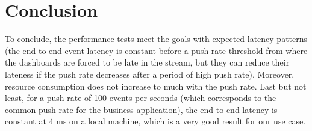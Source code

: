 \section{Conclusion}

To conclude, the performance tests meet the goals with expected latency patterns (the end-to-end event latency is constant before a push rate threshold from where the dashboards are forced to be late in the stream, but they can reduce their lateness if the push rate decreases after a period of high push rate). Moreover, resource consumption does not increase to much with the push rate. Last but not least, for a push rate of 100 events per seconds (which corresponds to the common push rate for the business application), the end-to-end latency is constant at 4 ms on a local machine, which is a very good result for our use case.






